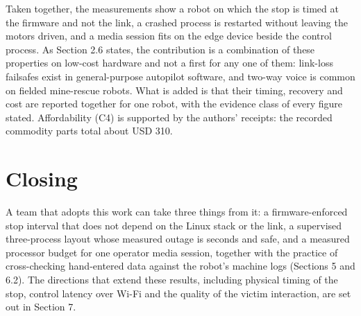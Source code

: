 Taken together, the measurements show a robot on which the stop is timed at the firmware and not the link, a crashed process is restarted without leaving the motors driven, and a media session fits on the edge device beside the control process. As Section 2.6 states, the contribution is a combination of these properties on low-cost hardware and not a first for any one of them: link-loss failsafes exist in general-purpose autopilot software, and two-way voice is common on fielded mine-rescue robots. What is added is that their timing, recovery and cost are reported together for one robot, with the evidence class of every figure stated. Affordability (C4) is supported by the authors' receipts: the recorded commodity parts total about USD 310.

\section*{Closing}

A team that adopts this work can take three things from it: a firmware-enforced stop interval that does not depend on the Linux stack or the link, a supervised three-process layout whose measured outage is seconds and safe, and a measured processor budget for one operator media session, together with the practice of cross-checking hand-entered data against the robot's machine logs (Sections 5 and 6.2). The directions that extend these results, including physical timing of the stop, control latency over Wi-Fi and the quality of the victim interaction, are set out in Section 7.

